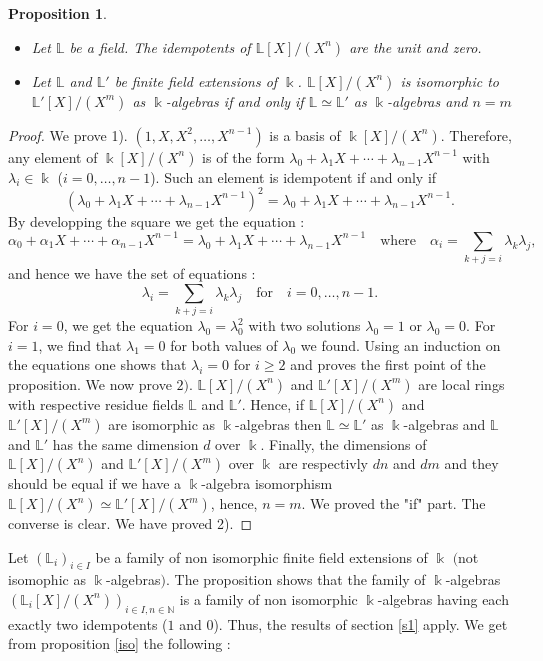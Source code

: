 \documentclass[12pt, reqno]{amsart}
\newtheorem{proposition}[theorem]{Proposition}
\newcommand{\N}{ {\mathbb N} }
\newcommand{\K}{ {\Bbbk} }
\newcommand{\e}{ {X} }
\newcommand{\FL}{ {\mathbb L} }
\begin{document}
\begin{proposition}\label{id}

\begin{itemize}
\item[1)] Let $\FL$ be a field. The idempotents of $\FL[X]/(X^n)$ are the unit and zero.
\item[2)] Let $\FL$ and $\FL'$ be finite field extensions of $\K$. $\FL[X]/(X^n)$ is isomorphic to $\FL'[X]/(X^m)$ as $\K$-algebras if and only if $\FL\simeq \FL'$ as $\K$-algebras and $n=m$
\end{itemize}
\end{proposition}
\begin{proof}
 We prove 1). $(1,X,X^2 , \dots,\e^{n-1}) $ is a basis of $\K[X]/(X^n)$. Therefore, any element of $\K[X]/(X^n)$ is of the form $\lambda_0 + \lambda_1 \e + \cdots + \lambda_{n-1} \e^{n-1}$ with $\lambda_i \in \K$ ($i=0,\dots,n-1$). Such an element is idempotent if and only if $$(\lambda_0 + \lambda_1 \e + \cdots + \lambda_{n-1} \e^{n-1})^2=\lambda_0 + \lambda_1 \e + \cdots + \lambda_{n-1} \e^{n-1}.$$  By developping the square we get the equation : $$\alpha_0 + \alpha_1 \e + \cdots + \alpha_{n-1} \e^{n-1}=  \lambda_0 + \lambda_1 \e + \cdots + \lambda_{n-1} \e^{n-1} \quad \text{where}\quad \alpha_i=\underset{k+j=i}{\sum} \lambda_k \lambda_j,$$ and hence we have the set of equations : $$ \lambda_i  =  \underset{k+j=i}{\sum} \lambda_k \lambda_j \quad \text{for} \quad i=0,\dots,n-1.$$ For $i=0$, we get the equation $\lambda_0=\lambda_0^2$ with two solutions $\lambda_0=1$ or $\lambda_0=0$. For $i=1$, we find that $\lambda_1=0$ for both values of $\lambda_0$ we found. Using an induction on the equations one shows that $\lambda_i=0$ for $i\geq 2  $ and proves the first point of the proposition. We now prove $2)$. $\FL[X]/(X^n)$ and $\FL'[X]/(X^m)$ are local rings with respective residue fields $\FL$ and $\FL'$. Hence, if $\FL[X]/(X^n)$ and $\FL'[X]/(X^m)$ are isomorphic as $\K$-algebras then $\FL\simeq \FL'$ as $\K$-algebras and $\FL$ and $\FL'$ has the same dimension $d$ over $\K$. Finally, the dimensions of $\FL[X]/(X^n)$ and $\FL'[X]/(X^m)$ over $\K$ are respectivly $dn$ and $dm$ and they should be equal if we have a $\K$-algebra isomorphism $\FL[X]/(X^n)\simeq \FL'[X]/(X^m)$, hence, $n=m$. We proved the "if" part. The converse is clear. We have proved 2). 
\end{proof} 
Let $(\FL_i)_{i\in I}$ be a family of non isomorphic finite field extensions of $\K$ $($not isomophic as $\K$-algebras$)$. The proposition shows that the family of  $\K$-algebras   $(\FL_i[X]/(X^n))_{i\in I,n \in \N}$ is a family of non isomorphic $\K$-algebras having each exactly two idempotents ($1$ and $0$). Thus, the results of section \ref{s1} apply. We get from proposition \ref{iso} the following :
\end{document}
